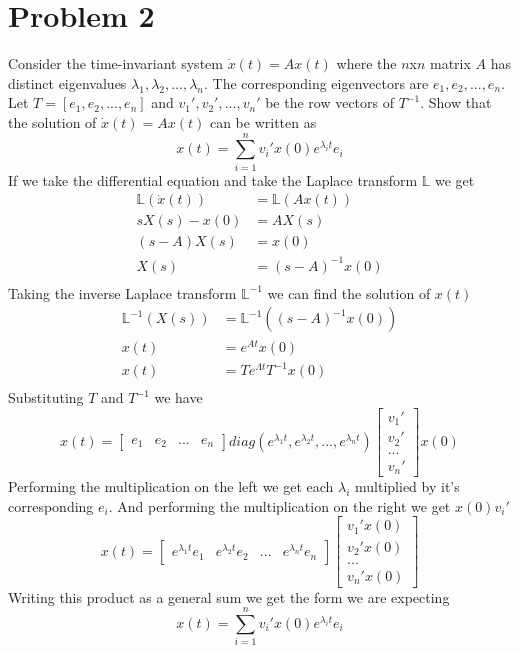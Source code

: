 \documentclass{article}
\begin{document}
\newpage
\section*{Problem 2}
Consider the time-invariant system $\dot{x}(t) = Ax(t)$ where the $n$x$n$ matrix $A$ has distinct eigenvalues $\lambda_1, \lambda_2, ..., \lambda_n$.
The corresponding eigenvectors are $e_1, e_2, ...,e_n$.
Let $T = [e_1,e_2,...,e_n]$ and $v_1', v_2',...,v_n'$ be the row vectors of $T^{-1}$.
Show that the solution of $\dot{x}(t)=Ax(t)$ can be written as
$$ x(t) = \sum_{i=1}^n v_i' x(0) e^{\lambda_i t} e_i $$
\newline
\newline
If we take the differential equation and take the Laplace transform $\mathbb{L}$ we get
$$
\begin{aligned}
\mathbb{L}(\dot{x}(t)) &= \mathbb{L}(Ax(t)) \\
sX(s) - x(0) &= AX(s) \\
(s-A)X(s) &= x(0) \\
X(s) &= (s-A)^{-1}x(0) \\
\end{aligned}
$$
Taking the inverse Laplace transform $\mathbb{L}^{-1}$ we can find the solution of $x(t)$
$$
\begin{aligned}
\mathbb{L}^{-1}(X(s)) &= \mathbb{L}^{-1}((s-A)^{-1}x(0)) \\
x(t) &= e^{At}x(0) \\
x(t) &= Te^{\Lambda t}T^{-1}x(0) \\
\end{aligned}
$$
Substituting $T$ and $T^{-1}$ we have
$$ x(t) =
\begin{bmatrix} e_1& e_2& ... & e_n\end{bmatrix}
diag(e^{\lambda_1 t},e^{\lambda_2 t}, ..., e^{\lambda_n t})
\begin{bmatrix} v_1' \\ v_2' \\ ... \\ v_n'\end{bmatrix}
x(0)
$$
Performing the multiplication on the left we get each $\lambda_i$ multiplied by it's corresponding $e_i$.
And performing the multiplication on the right we get $x(0)v_i'$
$$ x(t) =
\begin{bmatrix} e^{\lambda_1 t}e_1 & e^{\lambda_2 t}e_2 & ... & e^{\lambda_n t}e_n\end{bmatrix}
\begin{bmatrix} v_1'x(0) \\ v_2'x(0) \\ ... \\ v_n'x(0)\end{bmatrix}
$$
Writing this product as a general sum we get the form we are expecting
$$ x(t) = \sum_{i=1}^n v_i' x(0) e^{\lambda_i t} e_i $$
\end{document}
